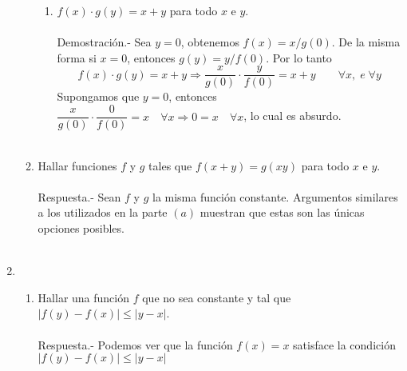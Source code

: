 \begin{enumerate}[\bfseries 1.]
\begin{enumerate}[\bfseries (a)]
\begin{enumerate}[\bfseries (i)]
		\item $f(x) \cdot g(y) = x+y$ para todo $x$ e $y$.\\\\
		    Demostración.-\; Sea $y=0$, obtenemos $f(x)=x/g(0)$. De la misma forma si $x=0$, entonces $g(y)=y/f(0)$. Por lo tanto $$  f(x) \cdot g(y) = x+y \Longrightarrow \dfrac{x}{g(0)}\cdot \dfrac{y}{f(0)}=x+y \qquad \forall x, \; e \; \forall y$$ Supongamos que $y=0$, entonces $\dfrac{x}{g(0)}\cdot \dfrac{0}{f(0)}=x \quad \forall x \Longrightarrow 0=x \quad \forall x$, lo cual es absurdo.\\\\

	    \end{enumerate}

	    \item Hallar funciones $f$ y $g$ tales que $f(x+y) = g(xy)$ para todo $x$ e $y$. \\\\
		Respuesta.-\; Sean $f$ y $g$ la misma función constante. Argumentos similares a los utilizados en la parte $(a)$ muestran que estas son las únicas opciones posibles. \\\\ 

	\end{enumerate}

	\item 
	\begin{enumerate}[\bfseries (a)]

	    \item Hallar una función $f$ que no sea constante y tal que $|f(y) - f(x)| \leq |y-x|$.\\\\
		Respuesta.-\; Podemos ver que la función $f(x)=x$ satisface la condición $|f(y) - f(x)| \leq |y-x|$\\\\


\end{enumerate}
\end{enumerate}
